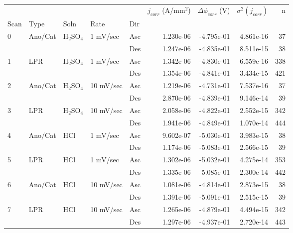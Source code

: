 \begin{tabular}{lllllrrrr}
\toprule
  &     &     &           &     &  $j_{corr}$ (A/mm$^2$) &  $\Delta \phi_{corr}$ (V) &  $\sigma^2(j_{corr})$ &    n \\
Scan & Type & Soln & Rate & Dir &                        &                           &                       &      \\
\midrule
0 & Ano/Cat & H$_2$SO$_4$ & 1 mV/sec & Asc &              1.230e-06 &                -4.795e-01 &             4.861e-16 &   37 \\
  &     &     &           & Des &              1.247e-06 &                -4.835e-01 &             8.511e-15 &   38 \\
1 & LPR & H$_2$SO$_4$ & 1 mV/sec & Asc &              1.342e-06 &                -4.830e-01 &             6.559e-16 &  338 \\
  &     &     &           & Des &              1.354e-06 &                -4.841e-01 &             3.434e-15 &  421 \\
2 & Ano/Cat & H$_2$SO$_4$ & 10 mV/sec & Asc &              1.219e-06 &                -4.731e-01 &             7.537e-16 &   37 \\
  &     &     &           & Des &              2.870e-06 &                -4.839e-01 &             9.146e-14 &   39 \\
3 & LPR & H$_2$SO$_4$ & 10 mV/sec & Asc &              2.058e-06 &                -4.822e-01 &             2.552e-15 &  342 \\
  &     &     &           & Des &              1.941e-06 &                -4.849e-01 &             1.070e-14 &  444 \\
4 & Ano/Cat & HCl & 1 mV/sec & Asc &              9.602e-07 &                -5.030e-01 &             3.983e-15 &   38 \\
  &     &     &           & Des &              1.174e-06 &                -5.083e-01 &             2.566e-15 &   39 \\
5 & LPR & HCl & 1 mV/sec & Asc &              1.302e-06 &                -5.032e-01 &             4.275e-14 &  353 \\
  &     &     &           & Des &              1.335e-06 &                -5.085e-01 &             2.300e-14 &  442 \\
6 & Ano/Cat & HCl & 10 mV/sec & Asc &              1.081e-06 &                -4.814e-01 &             2.873e-15 &   38 \\
  &     &     &           & Des &              1.391e-06 &                -5.091e-01 &             2.515e-15 &   39 \\
7 & LPR & HCl & 10 mV/sec & Asc &              1.265e-06 &                -4.879e-01 &             4.494e-15 &  342 \\
  &     &     &           & Des &              1.297e-06 &                -4.937e-01 &             2.720e-14 &  443 \\
\bottomrule
\end{tabular}
